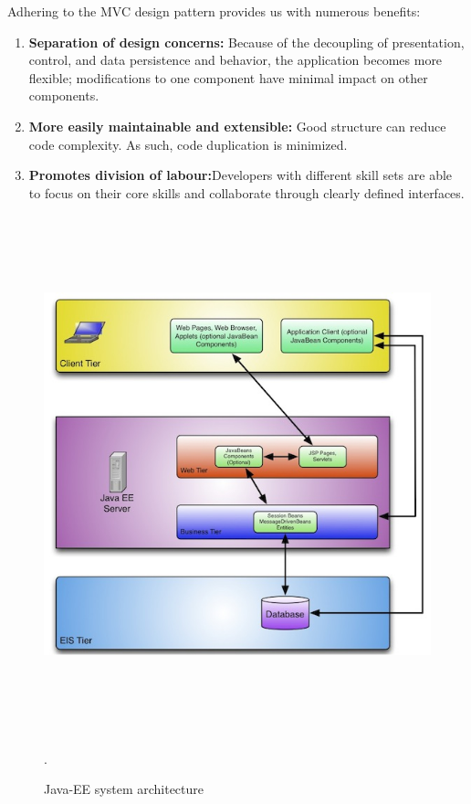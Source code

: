 \begin{flushleft}

Adhering to the MVC design pattern provides us with numerous benefits:

\begin{enumerate}
	\item \textbf{Separation of design concerns:} Because of the decoupling of presentation, control, and data persistence and behavior, the application becomes more flexible; modifications to one component have minimal impact on other components.
	\item \textbf{More easily maintainable and extensible:} Good structure can reduce code complexity. As such, code duplication is minimized.
	\item \textbf{Promotes division of labour:}Developers with different skill sets are able to focus on their core skills and collaborate through clearly defined interfaces.
\end{enumerate}

	\begin{figure}[H]
		\graphicspath{ {images/} }
		\includegraphics[width=\textwidth, height=15cm]{MVC.jpg}
	   	\caption{Java-EE system architecture}.
	\end{figure}


\end{flushleft}
